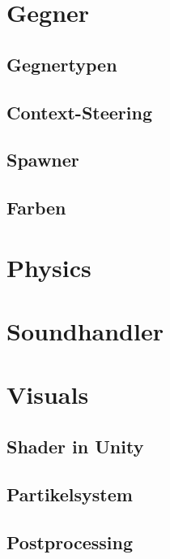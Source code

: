\documentclass[a4paper,10pt,ngerman,fontsize=12pt]{scrreprt}
\begin{document}
\section{Gegner}
\lipsum[3]



\subsection{Gegnertypen}
\lipsum[3]


\subsection{Context-Steering}
\lipsum[3]


\subsection{Spawner}
\lipsum[3]


\subsection{Farben}
\lipsum[3]


\section{Physics}
\lipsum[3]



\section{Soundhandler}
\lipsum[3]



\section{Visuals}
\lipsum[3]



\subsection{Shader in Unity}
\lipsum[3]


\subsection{Partikelsystem}
\lipsum[3]


\subsection{Postprocessing}
\lipsum[3]
\end{document}
